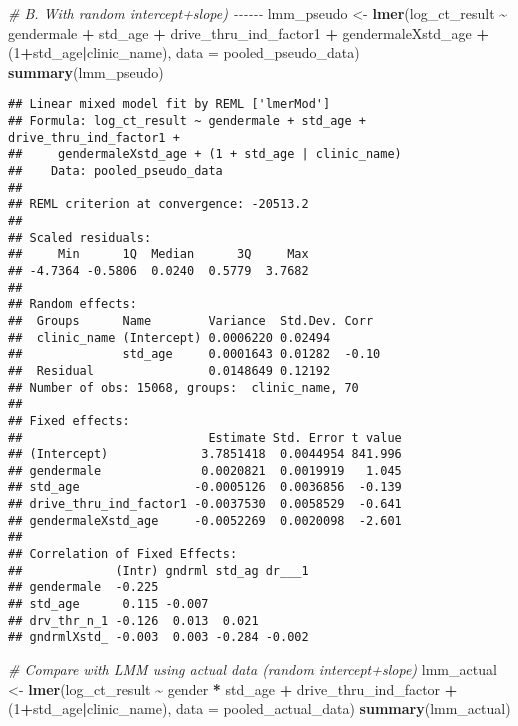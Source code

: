 \documentclass[
]{article}
\newenvironment{Shaded}{\begin{snugshade}}{\end{snugshade}}
\newcommand{\AttributeTok}[1]{\textcolor[rgb]{0.13,0.29,0.53}{#1}}
\newcommand{\CommentTok}[1]{\textcolor[rgb]{0.56,0.35,0.01}{\textit{#1}}}
\newcommand{\DecValTok}[1]{\textcolor[rgb]{0.00,0.00,0.81}{#1}}
\newcommand{\FunctionTok}[1]{\textcolor[rgb]{0.13,0.29,0.53}{\textbf{#1}}}
\newcommand{\NormalTok}[1]{#1}
\newcommand{\OtherTok}[1]{\textcolor[rgb]{0.56,0.35,0.01}{#1}}
\newcommand{\SpecialCharTok}[1]{\textcolor[rgb]{0.81,0.36,0.00}{\textbf{#1}}}
\begin{document}
\begin{Shaded}
\begin{Highlighting}[]
\CommentTok{\# B. With random intercept+slope) {-}{-}{-}{-}{-}{-}}
\NormalTok{lmm\_pseudo }\OtherTok{\textless{}{-}} \FunctionTok{lmer}\NormalTok{(log\_ct\_result }\SpecialCharTok{\textasciitilde{}}\NormalTok{ gendermale }\SpecialCharTok{+}\NormalTok{ std\_age }\SpecialCharTok{+}\NormalTok{ drive\_thru\_ind\_factor1 }\SpecialCharTok{+}\NormalTok{ gendermaleXstd\_age }\SpecialCharTok{+}\NormalTok{ (}\DecValTok{1}\SpecialCharTok{+}\NormalTok{std\_age}\SpecialCharTok{|}\NormalTok{clinic\_name), }\AttributeTok{data =}\NormalTok{ pooled\_pseudo\_data)}
\FunctionTok{summary}\NormalTok{(lmm\_pseudo)}
\end{Highlighting}
\end{Shaded}

\begin{verbatim}
## Linear mixed model fit by REML ['lmerMod']
## Formula: log_ct_result ~ gendermale + std_age + drive_thru_ind_factor1 +  
##     gendermaleXstd_age + (1 + std_age | clinic_name)
##    Data: pooled_pseudo_data
## 
## REML criterion at convergence: -20513.2
## 
## Scaled residuals: 
##     Min      1Q  Median      3Q     Max 
## -4.7364 -0.5806  0.0240  0.5779  3.7682 
## 
## Random effects:
##  Groups      Name        Variance  Std.Dev. Corr 
##  clinic_name (Intercept) 0.0006220 0.02494       
##              std_age     0.0001643 0.01282  -0.10
##  Residual                0.0148649 0.12192       
## Number of obs: 15068, groups:  clinic_name, 70
## 
## Fixed effects:
##                          Estimate Std. Error t value
## (Intercept)             3.7851418  0.0044954 841.996
## gendermale              0.0020821  0.0019919   1.045
## std_age                -0.0005126  0.0036856  -0.139
## drive_thru_ind_factor1 -0.0037530  0.0058529  -0.641
## gendermaleXstd_age     -0.0052269  0.0020098  -2.601
## 
## Correlation of Fixed Effects:
##             (Intr) gndrml std_ag dr___1
## gendermale  -0.225                     
## std_age      0.115 -0.007              
## drv_thr_n_1 -0.126  0.013  0.021       
## gndrmlXstd_ -0.003  0.003 -0.284 -0.002
\end{verbatim}

\begin{Shaded}
\begin{Highlighting}[]
\CommentTok{\# Compare with LMM using actual data (random intercept+slope)}
\NormalTok{lmm\_actual }\OtherTok{\textless{}{-}} \FunctionTok{lmer}\NormalTok{(log\_ct\_result }\SpecialCharTok{\textasciitilde{}}\NormalTok{ gender }\SpecialCharTok{*}\NormalTok{ std\_age }\SpecialCharTok{+}\NormalTok{ drive\_thru\_ind\_factor }\SpecialCharTok{+}\NormalTok{ (}\DecValTok{1}\SpecialCharTok{+}\NormalTok{std\_age}\SpecialCharTok{|}\NormalTok{clinic\_name), }\AttributeTok{data =}\NormalTok{ pooled\_actual\_data)}
\FunctionTok{summary}\NormalTok{(lmm\_actual)}
\end{Highlighting}
\end{Shaded}
\end{document}

